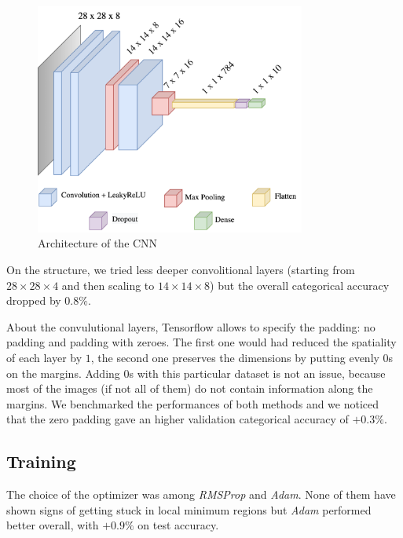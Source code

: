 \documentclass[compsoc]{IEEEtran}
\begin{document}
\begin{figure}[ht!]
\centering                                                                        
\includegraphics[width=3.5in]{cnn.png}
\captionsetup{justification=centering}                                                                                         
\caption{Architecture of the CNN}
\label{fig:cnn}                                                                                                                               
\end{figure}

On the structure, we tried less deeper convolitional layers (starting from $28\times28\times4$ and then scaling to $14\times14\times8$) but the overall categorical accuracy dropped by $0.8\%$.

About the convulutional layers, Tensorflow allows to specify the padding: no padding and padding with zeroes. The first one would had reduced the spatiality of each layer by $1$, the second one preserves the dimensions by putting evenly $0$s on the margins. Adding $0$s with this particular dataset is not an issue, because most of the images (if not all of them) do not contain information along the margins.
We benchmarked the performances of both methods and we noticed that the zero padding gave an higher validation categorical accuracy of $+0.3\%$.




\subsection{Training}
The choice of the optimizer was among \emph{RMSProp} and \emph{Adam}. 
None of them have shown signs of getting stuck in local minimum regions but \emph{Adam} performed better overall, with $+0.9\%$ on test accuracy. \par
\end{document}
